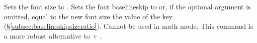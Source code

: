 \documentclass{beerydoc}
\begin{document}
\begin{codedoc}{\setfontsize}
  \begin{syntax}
      
  \end{syntax}
  Sets the font size to .
  Sets the font baselineskip to  or, if the optional argument is
  omitted, equal to the new font size \texttimes{} the value of the key
   (\S\ref{subsec:baselineskipsizeratio}).
  Cannot be used in math mode.
  This command is a more robust alternative to  + .

  \begin{codedemo}
    \begingroup
      \the\currentfontsize

      \setfontsize{0.8\currentnormalsize}
      \the\currentfontsize

      \setfontsize{12pt}
      \the\currentfontsize

      \setfontsize{1.2\currentfontsize}
      \the\currentfontsize

      \setfontsize{\currentfontsize-2pt}
      \the\currentfontsize
    \endgroup
  \end{codedemo}
\end{codedoc}
\end{document}
